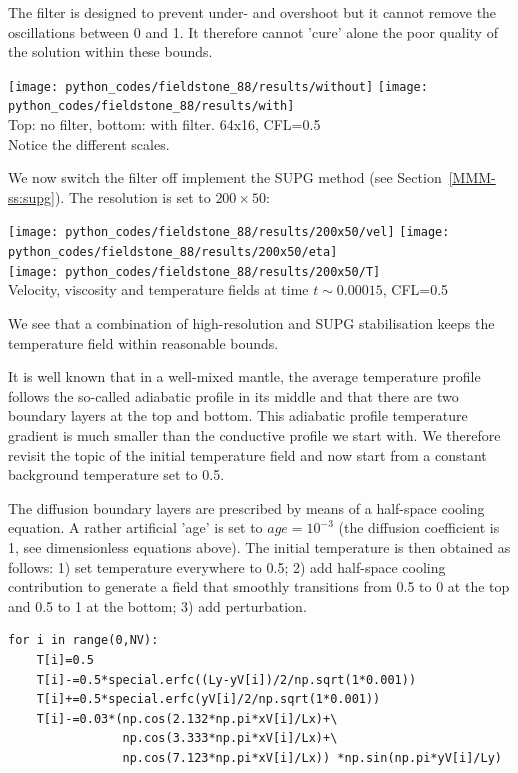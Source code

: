 The filter is designed to prevent under- and overshoot but it cannot remove the oscillations between 0 and 1.
It therefore cannot 'cure' alone the poor quality of the solution within these bounds.
\begin{center}
\texttt{[image: python\_codes/fieldstone\_88/results/without]}
\texttt{[image: python\_codes/fieldstone\_88/results/with]}\\
{\captionfont Top: no filter, bottom: with filter. 64x16, CFL=0.5\\ Notice the different scales.}
\end{center}

We now switch the filter off implement the SUPG method (see Section~\ref{MMM-ss:supg}). 
The resolution is set to $200 \times 50$:
\begin{center}
\texttt{[image: python\_codes/fieldstone\_88/results/200x50/vel]}
\texttt{[image: python\_codes/fieldstone\_88/results/200x50/eta]}\\
\texttt{[image: python\_codes/fieldstone\_88/results/200x50/T]}\\
{\captionfont Velocity, viscosity and temperature fields at time $t\sim 0.00015$, CFL=0.5} 
\end{center}
We see that a combination of high-resolution and SUPG stabilisation keeps the 
temperature field within reasonable bounds. 


It is well known that in a well-mixed mantle, the average temperature profile 
follows the so-called adiabatic profile in its middle and that there are two 
boundary layers at the top and bottom. This adiabatic profile temperature gradient 
is much smaller than the conductive profile we start with.
We therefore revisit the topic of the initial temperature field and now start 
from a constant background temperature set to 0.5. 

The diffusion boundary layers are prescribed by means of a half-space cooling equation.
A rather artificial 'age' is set to $age=10^{-3}$ (the diffusion coefficient is 1, 
see dimensionless equations above).
The initial temperature is then obtained as follows: 1) set temperature everywhere to 0.5; 
2) add half-space cooling contribution to generate a field that smoothly transitions 
from 0.5 to 0 at the top and 0.5 to 1 at the bottom; 3) add perturbation. 

\begin{lstlisting}
for i in range(0,NV):
    T[i]=0.5
    T[i]-=0.5*special.erfc((Ly-yV[i])/2/np.sqrt(1*0.001))
    T[i]+=0.5*special.erfc(yV[i]/2/np.sqrt(1*0.001))
    T[i]-=0.03*(np.cos(2.132*np.pi*xV[i]/Lx)+\
                np.cos(3.333*np.pi*xV[i]/Lx)+\
                np.cos(7.123*np.pi*xV[i]/Lx)) *np.sin(np.pi*yV[i]/Ly)
\end{lstlisting}


